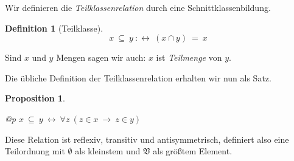 \documentclass[a4paper,german,10pt,twoside]{book}
\newtheorem{prop}[thm]{Proposition}
\theoremstyle{definition}
\newtheorem{defn}[thm]{Definition}
\theoremstyle{remark}
\begin{document}
\par
Wir definieren die \emph{Teilklassenrelation} durch eine Schnittklassenbildung.

\begin{defn}[Teilklasse]
\label{definition:subclass} \hypertarget{definition:subclass}{}
$$x \ \subseteq \ y\ :\leftrightarrow \ (x \cap y) \ =  \ x$$

\end{defn}

Sind $x$ und $y$ Mengen sagen wir auch: $x$ ist \emph{Teilmenge} von $y$.


\par
Die {\"u}bliche Definition der Teilklassenrelation erhalten wir nun als Satz.

\begin{prop}
\label{theorem:subsetIfMemberschipImpl} \hypertarget{theorem:subsetIfMemberschipImpl}{}
\mbox{}
\begin{longtable}{{@{\extracolsep{\fill}}p{\linewidth}}}
\centering $x \ \subseteq \ y\ \leftrightarrow \ \forall z\ (z \in x\ \rightarrow \ z \in y)$
\end{longtable}

\end{prop}




\par
Diese Relation ist reflexiv, transitiv und antisymmetrisch, definiert also eine Teilordnung mit $\emptyset$ als kleinstem und $\mathfrak{V}$ als gr{\"o}{\ss}tem Element.
\end{document}

